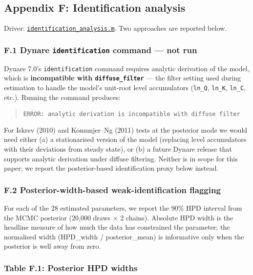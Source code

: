 \documentclass[
]{article}
\begin{document}
\subsection{Appendix F: Identification
analysis}\label{appendix-f-identification-analysis}

Driver:
\href{identification_analysis.m}{\texttt{identification\_analysis.m}}.
Two approaches are reported below.

\subsubsection{\texorpdfstring{F.1 Dynare \texttt{identification}
command --- not
run}{F.1 Dynare identification command --- not run}}\label{f.1-dynare-identification-command-not-run}

Dynare 7.0's \texttt{identification} command requires analytic
derivation of the model, which is \textbf{incompatible with
\texttt{diffuse\_filter}} --- the filter setting used during estimation
to handle the model's unit-root level accumulators (\texttt{ln\_Q},
\texttt{ln\_K}, \texttt{ln\_C}, etc.). Running the command produces:

\begin{quote}
\texttt{ERROR:\ analytic\ derivation\ is\ incompatible\ with\ diffuse\ filter}
\end{quote}

For Iskrev (2010) and Komunjer--Ng (2011) tests at the posterior mode we
would need either (a) a stationarised version of the model (replacing
level accumulators with their deviations from steady state), or (b) a
future Dynare release that supports analytic derivation under diffuse
filtering. Neither is in scope for this paper; we report the
posterior-based identification proxy below instead.

\subsubsection{F.2 Posterior-width-based weak-identification
flagging}\label{f.2-posterior-width-based-weak-identification-flagging}

For each of the 28 estimated parameters, we report the 90\% HPD interval
from the MCMC posterior (20,000 draws × 2 chains). Absolute HPD width is
the headline measure of how much the data has constrained the parameter;
the normalised width (HPD\_width / \textbar posterior\_mean\textbar) is
informative only when the posterior is well away from zero.

\subsubsection{Table F.1: Posterior HPD
widths}\label{table-f.1-posterior-hpd-widths}
\end{document}
